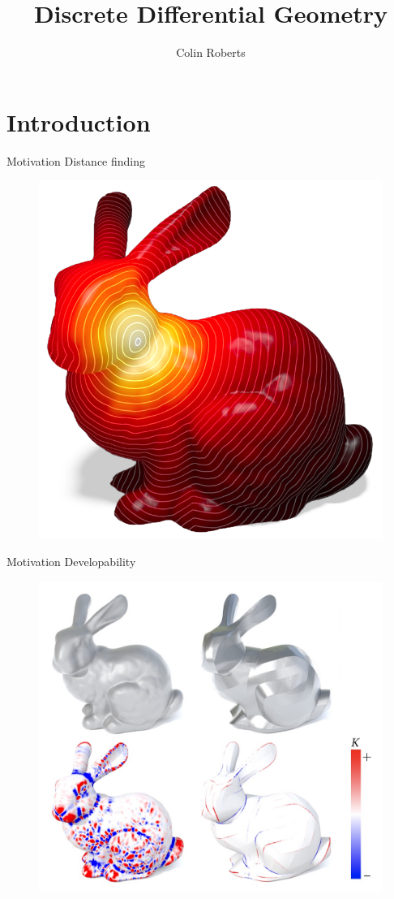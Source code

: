 \documentclass[UKenglish]{beamer}
\author{Colin Roberts}
\title{Discrete Differential Geometry}
\begin{document}
\section{Introduction}

\begin{frame}{Motivation}
    Distance finding
    \begin{figure}
        \centering
        \includegraphics[width=.7\textheight]{Figures/heat_bunny.png}
    \end{figure}
\end{frame}

\begin{frame}{Motivation}
    Developability
    \begin{figure}
        \centering
        \includegraphics[width=.8\textheight]{Figures/developability_bunny.jpg}
    \end{figure}
\end{frame}
\end{document}
